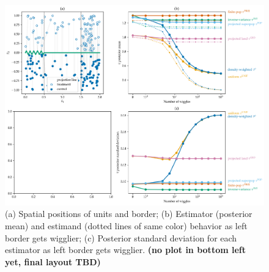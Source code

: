 \documentclass[letter]{article}
\makeatletter
\def\maxwidth{\ifdim\Gin@nat@width>\linewidth\linewidth
\else\Gin@nat@width\fi}
\let\Oldincludegraphics\includegraphics
\renewcommand{\includegraphics}[1]{\Oldincludegraphics[width=1.0\maxwidth]{#1}}
\makeatother
\begin{document}
    	\begin{figure}
\centering
\includegraphics{../figures/wiggly_boundaries.png}
\caption{\label{fig:wiggly_boundaries} (a) Spatial positions of units and border; (b) Estimator (posterior mean) and estimand (dotted lines of same color) behavior as left border gets wigglier; (c) Posterior standard deviation for each estimator as left border gets wigglier. \textbf{(no plot in bottom left yet, final layout TBD)}}
\end{figure}
    
\end{document}
